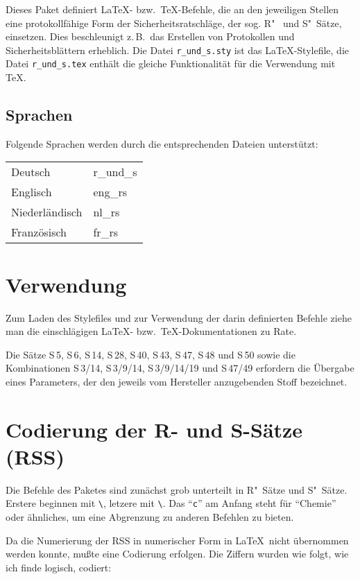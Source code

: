 \documentclass[german, pagesize=auto, fontsize=12pt, headings=normal]{scrartcl}
\makeatletter
\newcommand*{\cs}[1]{\texttt{\textbackslash#1}}
\newcommand*{\cmd}[1]{\cs{\expandafter\@gobble\string#1}}
\makeatother
\begin{document}
Dieses Paket definiert \LaTeX- bzw.\ \TeX-Befehle, die an den jeweiligen
Stellen eine protokollfähige Form der Sicherheitsratschläge, der sog. R"~
und S"~Sätze, einsetzen. Dies beschleunigt z.\,B.\ das Erstellen von
Protokollen und Sicherheitsblättern erheblich. Die Datei \texttt{r\_und\_s.sty} ist
das \LaTeX-Stylefile, die Datei \texttt{r\_und\_s.tex} enthält die gleiche
Funktionalität für die Verwendung mit \TeX.


\subsection{Sprachen}

Folgende Sprachen werden durch die entsprechenden Dateien unterstützt:

\medskip
\begin{tabular}{@{}l>{\ttfamily}l@{}}
  Deutsch        & r\_und\_s \\
  Englisch       & eng\_rs   \\
  Niederländisch & nl\_rs    \\
  Französisch    & fr\_rs    \\
\end{tabular}


\section{Verwendung}

Zum Laden des Stylefiles und zur Verwendung der darin definierten Befehle
ziehe man die einschlägigen \LaTeX- bzw.\ \TeX-Dokumentationen zu Rate.

Die Sätze S\,5, S\,6, S\,14, S\,28, S\,40, S\,43, S\,47, S\,48 und S\,50 sowie die
Kombinationen S\,3/14, S\,3/9/14, S\,3/9/14/19 und S\,47/49 erfordern die Übergabe
eines Parameters, der den jeweils vom Hersteller anzugebenden Stoff
bezeichnet.


\section{Codierung der R- und S-Sätze (RSS)}

Die Befehle des Paketes sind zunächst grob unterteilt in R"~Sätze und
S"~Sätze. Erstere beginnen mit \cmd{\cr}, letzere mit \cmd{\cs}. Das \enquote{\texttt{c}} am Anfang steht
für \enquote{Chemie} oder ähnliches, um eine Abgrenzung zu anderen Befehlen zu
bieten.

Da die Numerierung der RSS in numerischer Form in \LaTeX\ nicht übernommen
werden konnte, mußte eine Codierung erfolgen. Die Ziffern wurden wie folgt,
wie ich finde logisch, codiert:
\end{document}
